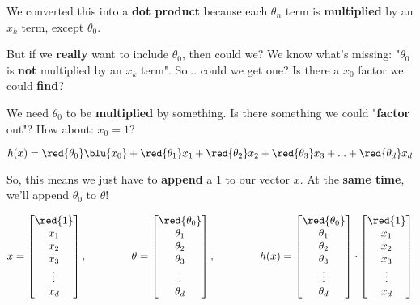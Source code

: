         We converted this into a \textbf{dot product} because each $\theta_n$ term is \textbf{multiplied} by an $x_k$ term, except $\theta_0$.
        
        But if we \textbf{really} want to include $\theta_0$, then could we? We know what's missing: "$\theta_0$ is \textbf{not} multiplied by an $x_k$ term". So... could we get one? Is there a $x_0$ factor we could \textbf{find}?
        
        We need $\theta_0$ to be \textbf{multiplied} by something. Is there something we could "\textbf{factor} out"? How about: $x_0=1$?
        
        \begin{equation}
            h(x) = \red{\theta_0}\blu{x_0} + \red{\theta_1}x_1 + \red{\theta_2}x_2 + \red{\theta_3}x_3 + ... + \red{\theta_d}x_d
        \end{equation}
        
        So, this means we just have to \textbf{append} a 1 to our vector $x$. At the \textbf{same time}, we'll append $\theta_0$ to $\theta$!
        
        \begin{equation}
            x = 
            \begin{bmatrix}
              \red{1} \\ x_1 \\ x_2 \\ x_3 \\ \vdots \\ x_d
            \end{bmatrix},
            \;\;\;\;\;\;\;\;\;\;\;\;\;\;\;
            \theta = 
            \begin{bmatrix}
              \red{\theta_0} \\ \theta_1 \\ \theta_2 \\ \theta_3 \\ \vdots \\ \theta_d
            \end{bmatrix},
            \;\;\;\;\;\;\;\;\;\;\;\;\;\;\;
            h(x) = 
            \begin{bmatrix}
              \red{\theta_0} \\ \theta_1 \\ \theta_2 \\ \theta_3 \\ \vdots \\ \theta_d
            \end{bmatrix}
            \cdot
            \begin{bmatrix}
              \red{1} \\ x_1 \\ x_2 \\ x_3 \\ \vdots \\ x_d
            \end{bmatrix}
        \end{equation}

